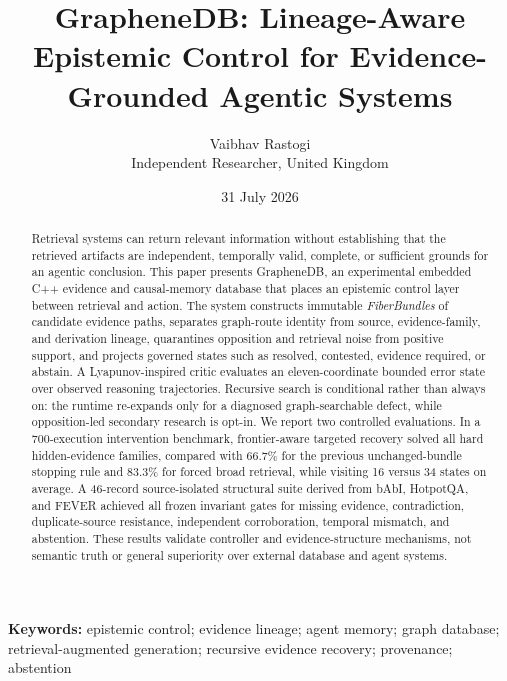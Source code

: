 \documentclass[11pt]{article}
\title{\textbf{GrapheneDB: Lineage-Aware Epistemic Control for Evidence-Grounded Agentic Systems}}
\author{Vaibhav Rastogi\\Independent Researcher, United Kingdom}
\date{31 July 2026}
\newcommand{\system}{GrapheneDB}
\begin{document}
\maketitle

\begin{abstract}
Retrieval systems can return relevant information without establishing that the retrieved artifacts are independent, temporally valid, complete, or sufficient grounds for an agentic conclusion. This paper presents \system, an experimental embedded C++ evidence and causal-memory database that places an epistemic control layer between retrieval and action. The system constructs immutable \emph{FiberBundles} of candidate evidence paths, separates graph-route identity from source, evidence-family, and derivation lineage, quarantines opposition and retrieval noise from positive support, and projects governed states such as resolved, contested, evidence required, or abstain. A Lyapunov-inspired critic evaluates an eleven-coordinate bounded error state over observed reasoning trajectories. Recursive search is conditional rather than always on: the runtime re-expands only for a diagnosed graph-searchable defect, while opposition-led secondary research is opt-in. We report two controlled evaluations. In a 700-execution intervention benchmark, frontier-aware targeted recovery solved all hard hidden-evidence families, compared with 66.7\% for the previous unchanged-bundle stopping rule and 83.3\% for forced broad retrieval, while visiting 16 versus 34 states on average. A 46-record source-isolated structural suite derived from bAbI, HotpotQA, and FEVER achieved all frozen invariant gates for missing evidence, contradiction, duplicate-source resistance, independent corroboration, temporal mismatch, and abstention. These results validate controller and evidence-structure mechanisms, not semantic truth or general superiority over external database and agent systems.
\end{abstract}

\noindent\textbf{Keywords:} epistemic control; evidence lineage; agent memory; graph database; retrieval-augmented generation; recursive evidence recovery; provenance; abstention











\appendix

\end{document}

